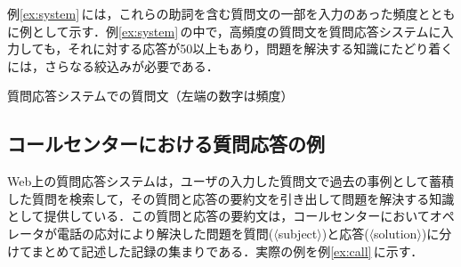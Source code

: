 例\ref{ex:system}\,には，これらの助詞を含む質問文の一部を入力のあった頻度とともに例として示す．例\ref{ex:system}\,の中で，高頻度の質問文を質問応答システムに入力しても，それに対する応答が50以上もあり，問題を解決する知識にたどり着くには，さらなる絞込みが必要である．

\begin{example}[ht]
\begin{center}
\end{center} 
\caption{質問応答システムでの質問文（左端の数字は頻度）}
 \label{ex:system}
\end{example}

\subsection{コールセンターにおける質問応答の例}
Web上の質問応答システムは，ユーザの入力した質問文で過去の事例として蓄積した質問を検索して，その質問と応答の要約文を引き出して問題を解決する知識として提供している．この質問と応答の要約文は，コールセンターにおいてオペレータが電話の応対により解決した問題を質問($\langle$subject$\rangle$)と応答($\langle$solution$\rangle$)に分けてまとめて記述した記録の集まりである．実際の例を例\ref{ex:call}\,に示す．

